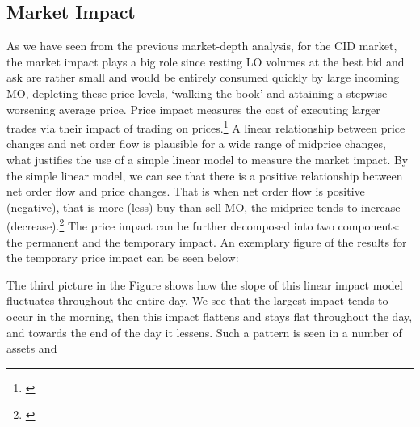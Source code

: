 \documentclass[12pt,a4paper]{cau_thesis}
\begin{document}
\subsection{Market Impact}\label{sub_sec:market_impact}
As we have seen from the previous market-depth analysis, for the CID
market, the market impact plays a big role since resting LO volumes
at the best bid and ask are rather small and would be entirely
consumed quickly by large incoming MO, depleting these price levels,
`walking the book' and attaining a stepwise worsening average price.
Price impact measures the cost of executing larger trades via their
impact of trading on prices.\footnote{\cite[See
    ][,p.88]{cartea2015algorithmic}} A linear relationship between price
changes and net order flow is plausible for a wide range of midprice
changes, what justifies the use of a simple linear model to measure
the market impact. By the simple linear model, we can see that there
is a positive relationship between net order flow and price changes.
That is when net order flow is positive (negative), that is more
(less) buy than sell MO, the midprice tends to increase
(decrease).\footnote{\cite[See ][,p.88]{cartea2015algorithmic}} The
price impact can be further decomposed into two components: the
permanent and the temporary impact. An exemplary figure of the
results for the temporary price impact can be seen below:
\begin{figure}[htbp]
    \vspace*{0.5cm}
    \centering
    \label{fig:order_flow_mid_price_drift}
\end{figure}
The third picture in the Figure shows how the slope of this linear
impact model fluctuates throughout the entire day. We see that the
largest impact tends to occur in the morning, then this impact
flattens and stays flat throughout the day, and towards the end of
the day it lessens. Such a pattern is seen in a number of assets and
\end{document}
